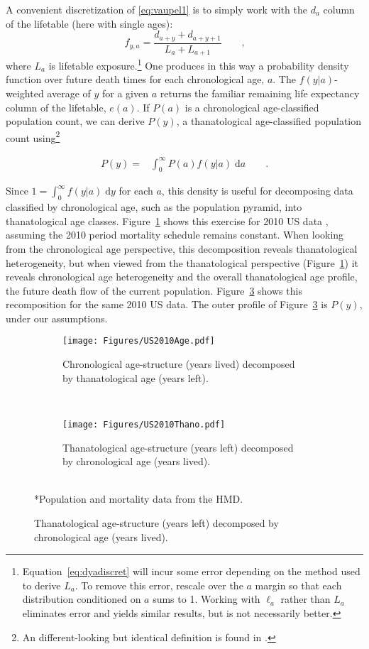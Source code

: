 \documentclass{article}
\newcommand{\dd}{\; \mathrm{d}}
\newcommand{\ec}{\quad\quad\text{,}}
\newcommand{\ep}{\quad\quad\text{.}}
\begin{document}
A convenient discretization of \eqref{eq:vaupel1} is to simply work with the
$d_a$ column of the lifetable (here with single ages):
\begin{equation}
\label{eq:dyadiscret}
f_{y, a} =  \frac{d_{a+y}+d_{a+y+1}}{L_a + L_{a+1}} \ec
\end{equation}
where $L_a$ is lifetable exposure.\footnote{Equation~\eqref{eq:dyadiscret}
will incur some error depending on the method used to derive $L_a$. To remove
this error, rescale over the $a$ margin so that each distribution conditioned on
$a$ sums to 1. Working with $\ell_a$ rather than $L_a$ eliminates error and
yields similar results, but is not necessarily better.} One produces in this way a probability density function over future death times for each chronological age,
$a$. The $f(y|a)$- weighted average of $y$ for a given $a$ returns the familiar
remaining life expectancy column of the lifetable, $e(a)$. If $P(a)$ is a
chronological age-classified population count, we can derive $P(y)$, a
thanatological age-classified population count using\footnote{An
different-looking but identical definition is found in
\citet{brouard1989mouvements}.}

\begin{align}
\label{eq:transform}
P(y) =& \int_0^\infty P(a) f(y | a) \dd a \ep
\end{align}

Since $1 = \int_0^\infty f(y|a) \dd y$ for each $a$,
this density is useful for decomposing data classified by chronological age,
such as the population pyramid, into thanatological age classes.
Figure~\ref{fig:USdecomp} shows this exercise for 2010 US data \citep{HMD},
assuming the 2010 period mortality schedule remains constant. When looking from the chronological age perspective, this decomposition reveals thanatological
heterogeneity, but when viewed from the thanatological perspective
(Figure~\ref{fig:USdecomp}) it reveals chronological age heterogeneity and the
overall thanatological age profile, the future death flow of the current
population.
Figure~\ref{fig:USrecomp} shows this recomposition for the same 2010
US data. The outer profile of Figure~\ref{fig:USrecomp} is $P(y)$, under our assumptions.

\begin{figure}[ht!]
	\caption{2010 US population structure}
	\begin{center}
	\begin{subfigure}{.45\textwidth}
		\caption{Chronological age-structure (years lived) decomposed by
		thanatological age (years left).}
		\label{fig:USdecomp}
		\texttt{[image: Figures/US2010Age.pdf]}
	\end{subfigure}
	~
	\begin{subfigure}{.45\textwidth}
		\caption{Thanatological age-structure (years left) decomposed by chronological
		age (years lived).}
		\label{fig:USrecomp}
		\texttt{[image: Figures/US2010Thano.pdf]}
	\end{subfigure}
	\\
	\small{*Population and mortality data from the HMD.}
	\end{center}
\end{figure}
\end{document}
